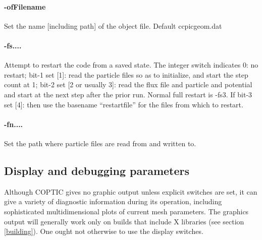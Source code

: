 \documentclass[12pt]{article}
\begin{document}
\paragraph{-ofFilename} Set the name [including path] of the object
file. Default ccpicgeom.dat

\paragraph{-fs....}  Attempt to restart the code from a saved
state. The integer switch indicates 0: no restart; bit-1 set [1]: read
the particle files so as to initialize, and start the step count at 1;
bit-2 set [2 or usually 3]: read the flux file and particle and
potential and start at the next step after the prior run. Normal full
restart is -fs3. If bit-3 set [4]: then use the basename
``restartfile'' for the files from which to restart.

\paragraph{-fn....} Set the path where particle files are read from
and written to.

\subsection{Display and debugging parameters}

Although COPTIC gives no graphic output unless explicit switches are
set, it can give a variety of diagnostic information during its
operation, including sophisticated multidimensional plots of current
mesh parameters.  The graphics output will generally work only on
builds that include X libraries (see section \ref{building}). One
ought not otherwise to use the display switches.
\end{document}
